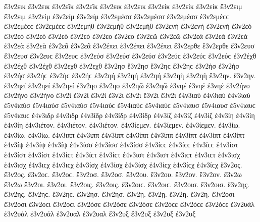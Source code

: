 {ἔ3ν2εικ ἔ3ν2εικ   %
ἐ3ν2εῖκ ἐ3ν2εῖκ   %
ἐ3ν2εικ ἐ3ν2εικ   %
ἐ3ν2είκ ἐ3ν2είκ ἐ3ν2είκ   %
ἔ3ν2ειμ ἔ3ν2ειμ   %
ἐ3ν2είμ ἐ3ν2είμ ἐ3ν2είμ 
ἐ3ν2εμέσσ ἐ3ν2εμέσσ ἐ3ν2εμέσσ ἐ3ν2εμέϲϲ ἐ3ν2εμέϲϲ ἐ3ν2εμέϲϲ   %
ἐ3ν2εμήθ ἐ3ν2εμήθ ἐ3ν2εμήθ   %
ἐ3ν2ενή ἐ3ν2ενή ἐ3ν2ενή   %
ἐ3ν2εό ἐ3ν2εό ἐ3ν2εό   %
ἐ3ν2εὸ ἐ3ν2εὸ 
ἐ3ν2εο ἐ3ν2εο 
ἐ3ν2εῶ ἐ3ν2εῶ 
ἐ3ν2εά ἐ3ν2εά ἐ3ν2εά 
ἐ3ν2εὰ ἐ3ν2εὰ 
ἐ3ν2εᾶ ἐ3ν2εᾶ 
ἐ3ν2έπει ἐ3ν2έπει ἐ3ν2έπει 
ἔ3ν2ερθε ἔ3ν2ερθε   %
ἔ3ν2ευσ ἔ3ν2ευσ ἔ3ν2ευϲ ἔ3ν2ευϲ   %
ἐ3ν2εύσ ἐ3ν2εύσ ἐ3ν2εύσ ἐ3ν2εύϲ ἐ3ν2εύϲ ἐ3ν2εύϲ   %
ἐ3ν2έχθ ἐ3ν2έχθ ἐ3ν2έχθ   %
ἐ3ν2εχθ ἐ3ν2εχθ 
ἔ3ν2ησ ἔ3ν2ησ ἔ3ν2ηϲ ἔ3ν2ηϲ   %
ἐ3ν2ήσ ἐ3ν2ήσ ἐ3ν2ήσ ἐ3ν2ήϲ ἐ3ν2ήϲ ἐ3ν2ήϲ 
ἐ3ν2ηή ἐ3ν2ηή ἐ3ν2ηή   %
ἐ3ν2ηὴ ἐ3ν2ηὴ 
ἔ3ν2ην. ἔ3ν2ην.   %
ἐ3ν2ηεί ἐ3ν2ηεί ἐ3ν2ηεί   %
ἐ3ν2ηο ἐ3ν2ηο 
ἐ3ν2ηῶ ἐ3ν2ηῶ 
ἐ3νηέ ἐ3νηέ ἐ3νηέ 
ἐ3ν2ήνο ἐ3ν2ήνο ἐ3ν2ήνο   %
ἐ3ν2ί ἐ3ν2ί ἐ3ν2ί 
ἐ3ν2ι ἐ3ν2ι 
ἔ3ν2ι ἔ3ν2ι 
ἐ4ν3ιαύ ἐ4ν3ιαύ ἐ4ν3ιαύ   %
ἐ5ν4ιαύσ ἐ5ν4ιαύσ ἐ5ν4ιαύσ ἐ5ν4ιαύϲ ἐ5ν4ιαύϲ ἐ5ν4ιαύϲ   %
ἐ5ν4ιαυσ ἐ5ν4ιαυσ ἐ5ν4ιαυϲ ἐ5ν4ιαυϲ 
ἐ4ν3ιδρ ἐ4ν3ιδρ   %
ἐ4ν3ίδρ ἐ4ν3ίδρ ἐ4ν3ίδρ   %
ἐ4ν3ίζ ἐ4ν3ίζ ἐ4ν3ίζ   %
ἐ4ν3ίη ἐ4ν3ίη ἐ4ν3ίη   %
ἐ4ν3ιέτον. ἐ4ν3ιέτον. ἐ4ν3ιέτον. 
ἐ4ν3ίεμεν. ἐ4ν3ίεμεν. ἐ4ν3ίεμεν. 
ἐ4ν3ίω. ἐ4ν3ίω. ἐ4ν3ίω. 
ἐ4ν3ιππ ἐ4ν3ιππ   %
ἐ4ν3ίππ ἐ4ν3ίππ ἐ4ν3ίππ   %
ἐ4ν3ίπτ ἐ4ν3ίπτ ἐ4ν3ίπτ   %
ἐ4ν3ίψ ἐ4ν3ίψ ἐ4ν3ίψ 
ἐ4ν3ίσσ ἐ4ν3ίσσ ἐ4ν3ίσσ ἐ4ν3ίϲϲ ἐ4ν3ίϲϲ ἐ4ν3ίϲϲ   %
ἐ4ν3ίστ ἐ4ν3ίστ ἐ4ν3ίστ ἐ4ν3ίϲτ ἐ4ν3ίϲτ ἐ4ν3ίϲτ   %
ἐ4ν3ιστ ἐ4ν3ιστ ἐ4ν3ιϲτ ἐ4ν3ιϲτ 
ἐ4ν3ισχ ἐ4ν3ισχ ἐ4ν3ιϲχ ἐ4ν3ιϲχ   %
ἐ4ν3ίσχ ἐ4ν3ίσχ ἐ4ν3ίσχ ἐ4ν3ίϲχ ἐ4ν3ίϲχ ἐ4ν3ίϲχ   %
ἔ3ν2ος. ἔ3ν2ος. ἔ3ν2οϲ. ἔ3ν2οϲ.   %
ἔ3ν2οσ. ἔ3ν2οσ. 
ἔ3ν2ου. ἔ3ν2ου. 
ἔ3ν2ον. ἔ3ν2ον. 
ἔ3ν2ω ἔ3ν2ω 
ἔ3ν2οι. ἔ3ν2οι. 
ἔ3ν2οις. ἔ3ν2οις. ἔ3ν2οιϲ. ἔ3ν2οιϲ. 
ἔ3ν2οισ. ἔ3ν2οισ. 
ἔ3ν2ης. ἔ3ν2ης. ἔ3ν2ηϲ. ἔ3ν2ηϲ. 
ἔ3ν2ησ. ἔ3ν2ησ. 
ἔ3ν2ῃ. ἔ3ν2ῃ. 
ἔ3ν2η. ἔ3ν2η. 
ἔ3ν2οσι ἔ3ν2οσι ἔ3ν2οϲι ἔ3ν2οϲι   %
ἐ3ν2όσε ἐ3ν2όσε ἐ3ν2όσε ἐ3ν2όϲε ἐ3ν2όϲε ἐ3ν2όϲε 
ἐ3ν2υάλ ἐ3ν2υάλ ἐ3ν2υάλ   %
ἐ3ν2υαλ ἐ3ν2υαλ 
ἔ3ν2υξ ἔ3ν2υξ   %
ἐ3ν2υξ ἐ3ν2υξ   %
}
